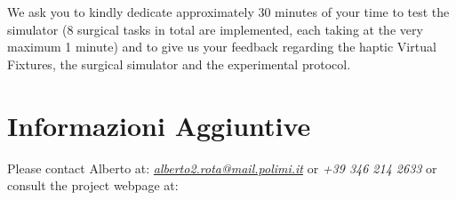\documentclass{article}
\begin{document}
\noindent We ask you to kindly dedicate approximately 30 minutes of your time to test the simulator (8 surgical tasks in total are implemented, each taking at the very maximum 1 minute) and to give us your feedback regarding the haptic Virtual Fixtures, the surgical simulator and the experimental protocol.

\section{Informazioni Aggiuntive}
Please contact Alberto at: \textit{\href{mailto:alberto2.rota@mail.polimi.it}{alberto2.rota@mail.polimi.it}} or \textit{+39 346 214 2633}
\newline or consult the project webpage at: \href{github}{} 


\end{document}
